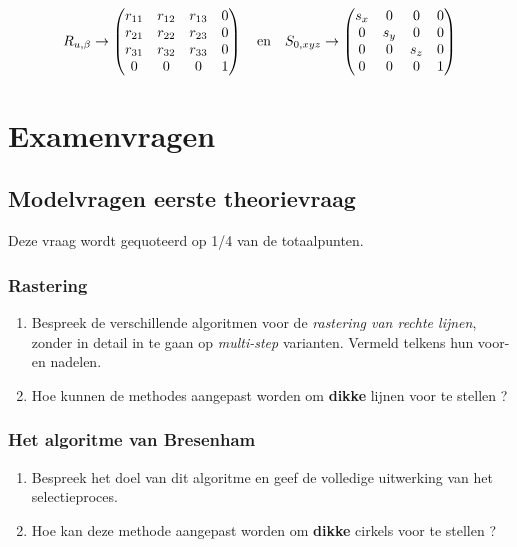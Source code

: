 \documentclass{report}
\begin{document}
$$
R_{u, \beta} \rightarrow
\begin{pmatrix}
r_{11} & r_{12} & r_{13} & 0 \\ 
r_{21} & r_{22} & r_{23} & 0 \\ 
r_{31} & r_{32} & r_{33} & 0 \\ 
0 & 0  & 0 & 1 \\ 
\end{pmatrix}
\quad \hbox{en} \quad 
S_{0, xyz} \rightarrow
\begin{pmatrix}
s_x & 0 & 0 & 0 \\
0 & s_y & 0 & 0 \\
0 & 0 & s_z & 0 \\
0 & 0  & 0 & 1 \\ 
\end{pmatrix}
$$
	\part{Examenvragen}
	\chapter{Modelvragen eerste theorievraag}
	Deze vraag wordt gequoteerd op 1/4 van de totaalpunten.
	
	\section{Rastering}
	\begin{enumerate}
		\item Bespreek de verschillende algoritmen voor de \textit{rastering van rechte lijnen}, zonder in detail in te gaan op \textit{multi-step} varianten. Vermeld telkens hun voor- en nadelen. 
		
		\item Hoe kunnen de methodes aangepast worden om \textbf{dikke} lijnen voor te stellen ? 
	\end{enumerate}

	\section{Het algoritme van Bresenham}
	\begin{enumerate}
		\item Bespreek het doel van dit algoritme en geef de volledige uitwerking van het selectieproces. 
		
		\item Hoe kan deze methode aangepast worden om \textbf{dikke} cirkels voor te stellen ? 
	\end{enumerate}
\end{document}
